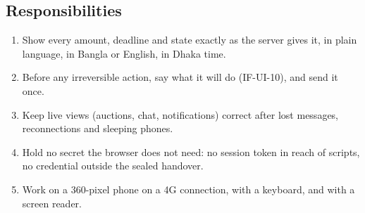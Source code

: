 \documentclass[11pt,a4paper]{article}
\begin{document}
\subsection{Responsibilities}
\begin{enumerate}[nosep]
  \item Show every amount, deadline and state exactly as the server gives it, in plain language, in Bangla or English, in Dhaka time.
  \item Before any irreversible action, say what it will do (IF-UI-10), and send it once.
  \item Keep live views (auctions, chat, notifications) correct after lost messages, reconnections and sleeping phones.
  \item Hold no secret the browser does not need: no session token in reach of scripts, no credential outside the sealed handover.
  \item Work on a 360-pixel phone on a 4G connection, with a keyboard, and with a screen reader.
\end{enumerate}
\end{document}
